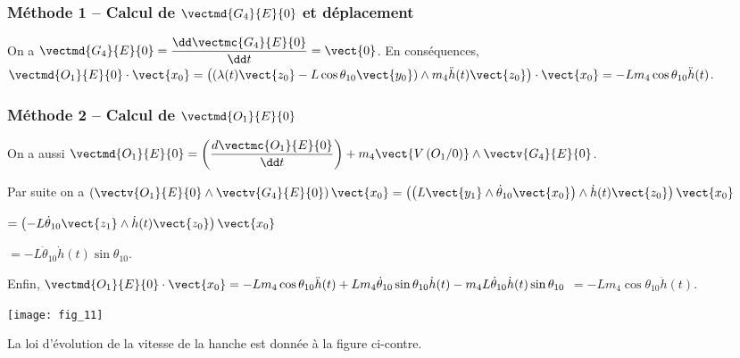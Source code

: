 \ifprof
\begin{corrige}
\subsubsection*{Méthode 1 -- Calcul de $\vectmd{G_4}{E}{0}$ et déplacement}
On a $\vectmd{G_4}{E}{0}= \dfrac{\dd \vectmc{G_4}{E}{0}}{\dd t}= \vect{0}$. En conséquences, 
$ \vectmd{O_1}{E}{0}\cdot \vect{x_0} 
= \left(\left( \lambda(t)\vect{z_0}-L\cos\theta_{10}\vect{y_0}\right)\wedge m_4\ddot{h}(t)\vect{z_0}\right) \cdot \vect{x_0} =  -Lm_4\cos\theta_{10}\ddot{h}(t)$.

\subsubsection*{Méthode 2 -- Calcul de $\vectmd{O_1}{E}{0}$}
On a aussi $\vectmd{O_1}{E}{0} = \left(\dfrac{d \vectmc{O_1}{E}{0}}{\dd t}\right)+m_4\vect{V\left(O_1/0\right)}\wedge\vectv{G_4}{E}{0} $. 

Par suite on a 
$\left(\vectv{O_1}{E}{0}\wedge\vectv{G_4}{E}{0}\right)\vect{x_0}=
\left(\left( L\vect{y_1}\wedge \dot{\theta}_{10} \vect{x_0} \right) \wedge\dot{h}(t)\vect{z_0}\right)\vect{x_0} $

$= \left( -L\dot{\theta}_{10} \vect{z_1} \wedge\dot{h}(t)\vect{z_0}\right)\vect{x_0} $ 

$= -L\dot{\theta}_{10} \dot{h}(t) \sin \theta_{10} $. 

Enfin, 
 $\vectmd{O_1}{E}{0}\cdot\vect{x_0}=-Lm_4\cos\theta_{10}\ddot{h}(t)+Lm_4\dot{\theta}_{10}\sin\theta_{10}\dot{h}(t)-m_4L\dot{\theta}_{10} \dot{h}(t) \sin \theta_{10}$
 $=-Lm_4\cos\theta_{10}\ddot{h}(t)$.
 
\end{corrige}

\else
\fi

\ifprof
\else


\begin{marginfigure}
\texttt{[image: fig\_11]}
\end{marginfigure}
La loi d'évolution de la vitesse de la hanche est donnée à la figure ci-contre. 

\fi


